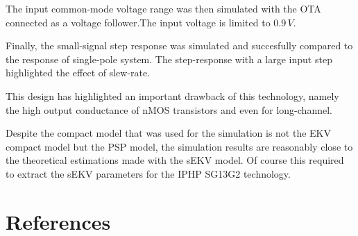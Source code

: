 \documentclass[
  a4paper,
  DIV=11,
  numbers=noendperiod]{scrreprt}
\begin{document}
The input common-mode voltage range was then simulated with the OTA
connected as a voltage follower.The input voltage is limited to
\(0.9\,V\).

Finally, the small-signal step response was simulated and succesfully
compared to the response of single-pole system. The step-response with a
large input step highlighted the effect of slew-rate.

This design has highlighted an important drawback of this technology,
namely the high output conductance of nMOS transistors and even for
long-channel.

Despite the compact model that was used for the simulation is not the
EKV compact model but the PSP model, the simulation results are
reasonably close to the theoretical estimations made with the sEKV
model. Of course this required to extract the sEKV parameters for the
IPHP SG13G2 technology.

\chapter*{References}\label{references}
\end{document}
